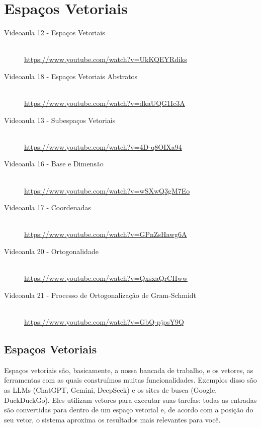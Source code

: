 \documentclass[../main.tex]{subfiles}
\begin{document}
	\chapter{Espaços Vetoriais}
	\begin{description}
		\item[Videoaula 12 - Espaços Vetoriais] \hfill \\
		\url{https://www.youtube.com/watch?v=UkKQEYRdiks}
		
		\item[Videoaula 18 - Espaços Vetoriais Abstratos] \hfill \\
		\url{https://www.youtube.com/watch?v=dkaUQG1Ic3A}
		
		\item[Videoaula 13 - Subespaços Vetoriais] \hfill \\
		\url{https://www.youtube.com/watch?v=4D-q8OIXa94}
		
		\item[Videoaula 16 - Base e Dimensão] \hfill \\
		\url{https://www.youtube.com/watch?v=wSXwQ3gM7Eo}
		
		\item[Videoaula 17 - Coordenadas] \hfill \\
		\url{https://www.youtube.com/watch?v=GPnZsHawg6A}
		
		\item[Videoaula 20 - Ortogonalidade] \hfill \\ \url{https://www.youtube.com/watch?v=QxsxaQrCHww}
		
		\item[Videoaula 21 - Processo de Ortogonalização de Gram-Schmidt ] \hfill \\
		\url{https://www.youtube.com/watch?v=GbQ-pjpsY9Q}
		
		
	\end{description}
	
	\newpage
	
	\section{Espaços Vetoriais}
	Espaços vetoriais são, basicamente, a nossa bancada de trabalho, e os vetores, as ferramentas com as quais construímos muitas funcionalidades. Exemplos disso são as LLMs (ChatGPT, Gemini, DeepSeek) e os sites de busca (Google, DuckDuckGo). Eles utilizam vetores para executar suas tarefas: todas as entradas são convertidas para dentro de um espaço vetorial e, de acordo com a posição do seu vetor, o sistema aproxima os resultados mais relevantes para você.
	
\end{document}
